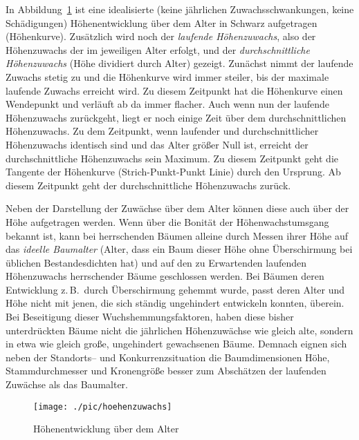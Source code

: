 \documentclass[twocolumn]{scrartcl}
\begin{document}
In Abbildung~\ref{fig:hoeheAlter} ist eine idealisierte (keine jährlichen
Zuwachsschwankungen, keine Schädigungen) Höhenentwicklung über dem Alter in
Schwarz aufgetragen (Höhenkurve). Zusätzlich wird noch der \emph{laufende
Höhenzuwachs}, also der Höhenzuwachs der im jeweiligen
Alter erfolgt, und der \emph{durchschnittliche
Höhenzuwachs} (Höhe dividiert durch Alter)
gezeigt. Zunächst nimmt der laufende Zuwachs stetig zu und die Höhenkurve wird
immer steiler, bis der maximale laufende Zuwachs erreicht wird. Zu diesem
Zeitpunkt hat die Höhenkurve einen Wendepunkt und verläuft ab da immer flacher.
Auch wenn nun der laufende Höhenzuwachs zurückgeht, liegt er noch einige Zeit
über dem durchschnittlichen Höhenzuwachs. Zu dem Zeitpunkt, wenn laufender und
durchschnittlicher Höhenzuwachs identisch sind und das Alter größer Null ist,
erreicht der durchschnittliche Höhenzuwachs sein Maximum. Zu diesem Zeitpunkt
geht die Tangente der Höhenkurve (Strich-Punkt-Punkt Linie) durch den Ursprung.
Ab diesem Zeitpunkt geht der durchschnittliche Höhenzuwachs zurück.

Neben der Darstellung der Zuwächse über dem Alter können diese auch über der
Höhe aufgetragen werden. Wenn über die Bonität der Höhenwachstumsgang bekannt
ist, kann bei herrschenden Bäumen alleine durch Messen ihrer Höhe auf das
\emph{ideelle Baumalter} (Alter, dass ein Baum dieser Höhe ohne Überschirmung
bei üblichen Bestandesdichten hat) und auf den zu Erwartenden laufenden
Höhenzuwachs herrschender Bäume geschlossen werden. Bei Bäumen deren
Entwicklung z.\,B.\ durch Überschirmung gehemmt wurde, passt deren Alter und
Höhe nicht mit jenen, die sich ständig ungehindert entwickeln konnten, überein.
Bei Beseitigung dieser Wuchshemmungsfaktoren, haben diese bisher unterdrückten
Bäume nicht die jährlichen Höhenzuwächse wie gleich alte, sondern in etwa wie
gleich große, ungehindert gewachsenen Bäume. Demnach eignen sich neben der
Standorts-- und Konkurrenzsituation die Baumdimensionen Höhe, Stammdurchmesser
und Kronengröße besser zum Abschätzen der laufenden Zuwächse als das Baumalter.

\begin{figure}[htbp]
  \centering
  \texttt{[image: ./pic/hoehenzuwachs]}
  \caption{Höhenentwicklung über dem Alter}
  \label{fig:hoeheAlter}
\end{figure}
\end{document}
